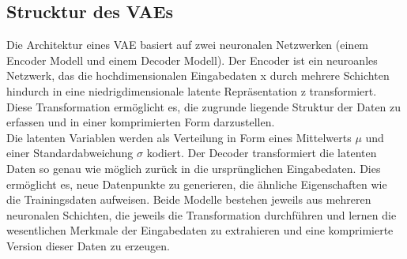\documentclass[%
thesis=student,%
coverpage=false,%
titlepage=false,%
headmarks=true, %
german,%
font=libertine, %
math=newpxtx, %
BCOR=5mm,%
coverBCOR=11mm%
]{tumbook}
\theoremstyle{break}
\begin{document}
\subsection{Strucktur des VAEs}
Die Architektur eines VAE basiert auf zwei neuronalen Netzwerken (einem Encoder Modell und einem Decoder Modell). Der Encoder ist ein neuroanles Netzwerk, das die hochdimensionalen Eingabedaten x durch mehrere Schichten hindurch in eine niedrigdimensionale latente Repräsentation z transformiert. Diese Transformation ermöglicht es, die zugrunde liegende Struktur der Daten zu erfassen und in einer komprimierten Form darzustellen.\\
Die latenten Variablen werden als Verteilung in Form eines Mittelwerts $\mu$ und einer Standardabweichung $\sigma$ kodiert. Der Decoder transformiert die latenten Daten so genau wie möglich zurück in die ursprünglichen Eingabedaten. Dies ermöglicht es, neue Datenpunkte zu generieren, die ähnliche Eigenschaften wie die Trainingsdaten aufweisen. Beide Modelle bestehen jeweils aus mehreren neuronalen Schichten, die jeweils die Transformation durchführen und lernen die wesentlichen Merkmale der Eingabedaten zu extrahieren und eine komprimierte Version dieser Daten zu erzeugen.\\
\\
\end{document}
